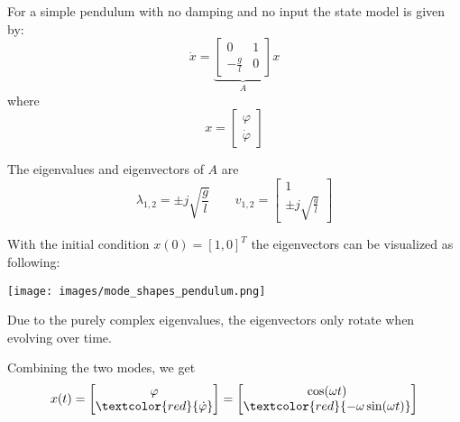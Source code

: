 \begin{examplesection}
    For a simple pendulum with no damping and no input the state model is given by:
    \begin{equation*}
        \dot{x}=\underbrace{\begin{bmatrix}
                0            & 1 \\
                -\frac{g}{l} & 0
            \end{bmatrix}}_{A}x
    \end{equation*}
    where
    \begin{equation*}
        x=\begin{bmatrix}
            \varphi \\
            \dot{\varphi}
        \end{bmatrix}
    \end{equation*}

    The eigenvalues and eigenvectors of $A$ are
    \begin{equation*}
        \lambda_{1,2} = \pm j \sqrt{\frac{g}{l}} \qquad v_{1,2}=\begin{bmatrix}
            1 \\
            \pm j \sqrt{\frac{g}{l}}
        \end{bmatrix}
    \end{equation*}

    With the initial condition $x(0) = {[1, 0]}^T$ the eigenvectors can be visualized as following:

    \texttt{[image: images/mode\_shapes\_pendulum.png]}

    Due to the purely complex eigenvalues, the eigenvectors only rotate when evolving over time.

    Combining the two modes, we get
    \begin{align*}
        x(t) = \begin{bmatrix}
                   \varphi \\
                   \textcolor{red}{\dot{\varphi}}
               \end{bmatrix}
        = \begin{bmatrix}
              \cos(\omega t) \\
              \textcolor{red}{-\omega\sin(\omega t)}
          \end{bmatrix}
    \end{align*}
\end{examplesection}